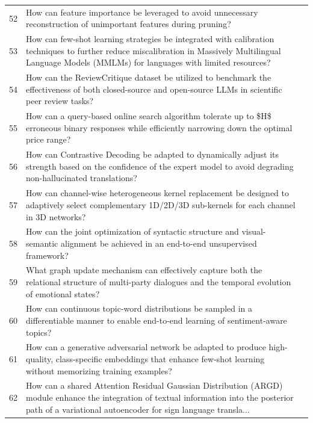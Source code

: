 \begin{longtable}{@{}p{0.5cm}p{7.2cm}p{2.5cm}@{}}
52 & How can feature importance be leveraged to avoid unnecessary reconstruction of unimportant features during pruning? & \cite{10.1609/aaai.v34i07.6720} \\
53 & How can few-shot learning strategies be integrated with calibration techniques to further reduce miscalibration in Massively Multilingual Language Models (MMLMs) for languages with limited resources? & \cite{10.18653/v1/2022.emnlp-main.290} \\
54 & How can the ReviewCritique dataset be utilized to benchmark the effectiveness of both closed-source and open-source LLMs in scientific peer review tasks? & \cite{10.18653/v1/2024.emnlp-main.292} \\
55 & How can a query-based online search algorithm tolerate up to \$H\$ erroneous binary responses while efficiently narrowing down the optimal price range? & \cite{10.1609/aaai.v36i9.21199} \\
56 & How can Contrastive Decoding be adapted to dynamically adjust its strength based on the confidence of the expert model to avoid degrading non-hallucinated translations? & \cite{10.18653/v1/2024.eacl-long.155} \\
57 & How can channel-wise heterogeneous kernel replacement be designed to adaptively select complementary 1D/2D/3D sub-kernels for each channel in 3D networks? & \cite{10.1609/aaai.v35i4.16433} \\
58 & How can the joint optimization of syntactic structure and visual-semantic alignment be achieved in an end-to-end unsupervised framework? & \cite{10.18653/v1/n19-1180} \\
59 & What graph update mechanism can effectively capture both the relational structure of multi-party dialogues and the temporal evolution of emotional states? & \cite{10.18653/v1/2022.acl-long.24} \\
60 & How can continuous topic-word distributions be sampled in a differentiable manner to enable end-to-end learning of sentiment-aware topics? & \cite{10.18653/v1/2021.eacl-main.199} \\
61 & How can a generative adversarial network be adapted to produce high-quality, class-specific embeddings that enhance few-shot learning without memorizing training examples? & \cite{10.18653/v1/2022.naacl-main.404} \\
62 & How can a shared Attention Residual Gaussian Distribution (ARGD) module enhance the integration of textual information into the posterior path of a variational autoencoder for sign language transla... & \cite{10.1609/aaai.v38i17.29937} \\

\end{longtable}
